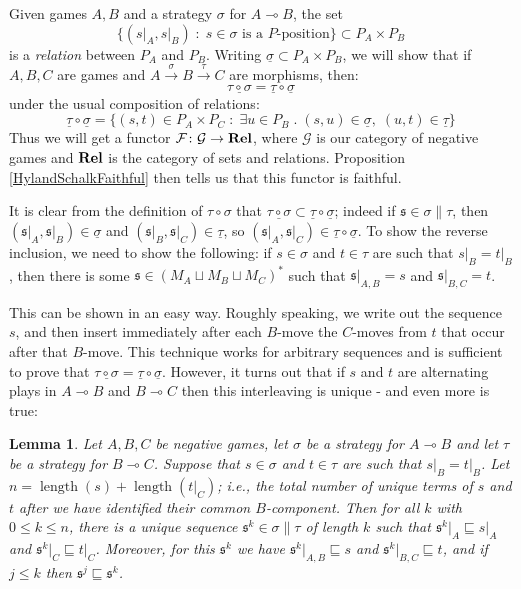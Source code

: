 \documentclass[11pt]{article} %
\theoremstyle{plain} %
\newtheorem{lemma}[theorem]{Lemma}
\theoremstyle{definition} %
\theoremstyle{note}
\theoremstyle{exercisestyle}
\newcommand{\catname}[1]{{\normalfont\textbf{#1}}}
\newcommand{\Rel}{\catname{Rel}}
\newcommand{\map}[3]{#2\xrightarrow{#1} #3}
\newcommand*\from{\colon}
\newcommand{\cmap}[3]{#1\from{}#2\to{}#3}
\renewcommand{\implies}{\multimap}
\newcommand{\comp}[2]{#1 \circ #2}
\newcommand{\cprd}{\sqcup}
\newcommand{\G}{\mathcal G}
\newcommand{\suchthat}{\;\colon\;}
\newcommand{\esuchthat}{\;.\;}
\newcommand{\F}{\mathcal F}
\newcommand{\s}{\mathfrak s}
\newcommand{\prefix}{\sqsubseteq}
\newcommand{\grel}[1]{\underline{#1}}
\DeclareMathOperator{\length}{length}
\begin{document}
Given games $A,B$ and a strategy $\sigma$ for $A\implies B$, the set
\[
  \{(s\vert_A,s\vert_B)\suchthat \textrm{$s\in\sigma$ is a $P$-position}\}\subset P_A\times P_B
  \]
is a \emph{relation} between $P_A$ and $P_B$.  Writing $\grel\sigma\subset P_A\times P_B$, we will show that if $A,B,C$ are games and $A\xrightarrow{\sigma}\map{\tau}{B}{C}$ are morphisms, then:
\[
  \grel{\comp\tau\sigma}=\comp{\grel\tau}{\grel\sigma}
  \]
under the usual composition of relations:
\[
  \comp{\grel\tau}{\grel\sigma} = \{(s,t)\in P_A\times P_C\suchthat \exists u\in P_B\esuchthat (s,u)\in\grel\sigma,\;(u,t)\in\grel\tau\}
  \]
Thus we will get a functor $\cmap{\F}{\G}{\Rel}$, where $\G$ is our category of negative games and $\Rel$ is the category of sets and relations.  Proposition \ref{HylandSchalkFaithful} then tells us that this functor is faithful.  

It is clear from the definition of $\comp\tau\sigma$ that $\grel{\comp\tau\sigma}\subset\comp{\grel\tau}{\grel\sigma}$; indeed if $\s\in\sigma\|\tau$, then $(\s\vert_A,\s\vert_B)\in\grel\sigma$ and $(\s\vert_B,\s\vert_C)\in\grel\tau$, so $(\s\vert_A,\s\vert_C)\in\comp{\grel\tau}{\grel\sigma}$.  To show the reverse inclusion, we need to show the following: if $s\in\sigma$ and $t\in\tau$ are such that $s\vert_B=t\vert_B$, then there is some $\s\in (M_A\cprd M_B\cprd M_C)^*$ such that $\s\vert_{A,B}=s$ and $\s\vert_{B,C}=t$.  

This can be shown in an easy way.  Roughly speaking, we write out the sequence $s$, and then insert immediately after each $B$-move the $C$-moves from $t$ that occur after that $B$-move.  This technique works for arbitrary sequences and is sufficient to prove that $\grel{\comp\tau\sigma}=\comp{\grel\tau}{\grel\sigma}$.  However, it turns out that if $s$ and $t$ are alternating plays in $A\implies B$ and $B\implies C$ then this interleaving is unique - and even more is true:

\begin{lemma}
  \label{LiftingLemma}
  Let $A,B,C$ be negative games, let $\sigma$ be a strategy for $A\implies B$ and let $\tau$ be a strategy for $B\implies C$.  Suppose that $s\in\sigma$ and $t\in\tau$ are such that $s\vert_B=t\vert_B$.  Let $n=\length(s)+\length(t\vert_C)$; i.e., the total number of unique terms of $s$ and $t$ after we have identified their common $B$-component.  Then for all $k$ with $0\le k\le n$, there is a unique sequence $\s^k\in\sigma\|\tau$ of length $k$ such that $\s^k\vert_A\prefix s\vert_A$ and $\s^k\vert_C\prefix t\vert_C$.  Moreover, for this $\s^k$ we have $\s^k\vert_{A,B}\prefix s$ and $\s^k\vert_{B,C}\prefix t$, and if $j\le k$ then $\s^j\prefix \s^k$.  
\end{lemma}
\end{document}
